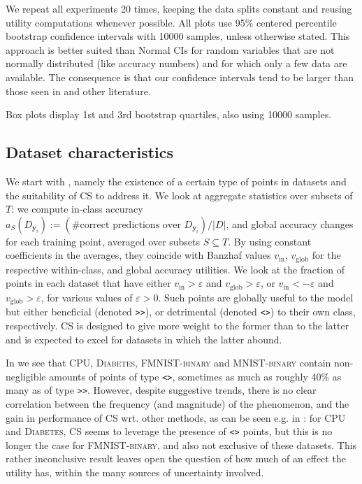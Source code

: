 \documentclass[10pt]{article}
\newcommand{\assign}{:=}
\newcommand{\tmmathbf}[1]{\ensuremath{\boldsymbol{#1}}}
\newcommand{\tmname}[1]{\textsc{#1}}
\newcommand{\tmop}[1]{\ensuremath{\operatorname{#1}}}
\newcommand{\tmtt}[1]{\texttt{#1}}
\begin{document}
We repeat all experiments 20 times, keeping the data splits constant and
reusing utility computations whenever possible. All plots use 95\% centered
percentile bootstrap confidence intervals with 10000 samples, unless otherwise
stated. This approach is better suited than Normal CIs for random variables
that are not normally distributed (like accuracy numbers) and for which only a
few data are available. The consequence is that our confidence intervals tend
to be larger than those seen in {\cite{schoch_csshapley_2022}} and other
literature.

Box plots display 1st and 3rd bootstrap quartiles, also using 10000 samples.

\subsection{Dataset characteristics}\label{sec:dataset-characteristics}

We start with , namely the existence of a
certain type of points in datasets and the suitability of CS to address it. We
look at aggregate statistics over subsets of $T$: we compute in-class accuracy
$a_S  (D_{\tmmathbf{y}_i}) \assign \left( \text{\# correct predictions over }
D_{\tmmathbf{y}_i} \right) / |D|$, and global accuracy changes for each
training point, averaged over subsets $S \subseteq T$. By using constant
coefficients in the averages, they coincide with Banzhaf values
$v_{\tmop{in}}$, $v_{\tmop{glob}}$ for the respective within-class, and global
accuracy utilities. We look at the fraction of points in each dataset that
have either $v_{\tmop{in}} > \varepsilon$ and $v_{\tmop{glob}} > \varepsilon$,
or $v_{\tmop{in}} < - \varepsilon$ and $v_{\tmop{glob}} > \varepsilon$, for
various values of $\varepsilon > 0$. Such points are globally useful to the
model but either beneficial (denoted {\tmtt{>>}}), or detrimental (denoted
{\tmtt{<>}}) to their own class, respectively. CS is designed to give more
weight to the former than to the latter and is expected to excel for datasets
in which the latter abound.

In  we see that {\tmname{CPU}},
{\tmname{Diabetes}}, {\tmname{FMNIST-binary}} and {\tmname{MNIST-binary}}
contain non-negligible amounts of points of type {\tmtt{<>}}, sometimes as
much as roughly 40\% as many as of type {\tmtt{>>}}. However, despite
suggestive trends, there is no clear correlation between the frequency (and
magnitude) of the phenomenon, and the gain in performance of CS wrt. other
methods, as can be seen e.g. in : for
{\tmname{CPU}} and {\tmname{Diabetes}}, CS seems to leverage the presence of
{\tmtt{<>}} points, but this is no longer the case for
{\tmname{FMNIST-binary}}, and also not exclusive of these datasets. This
rather inconclusive result leaves open the question of how much of an effect
the utility  has, within the many sources of uncertainty
involved.
\end{document}

